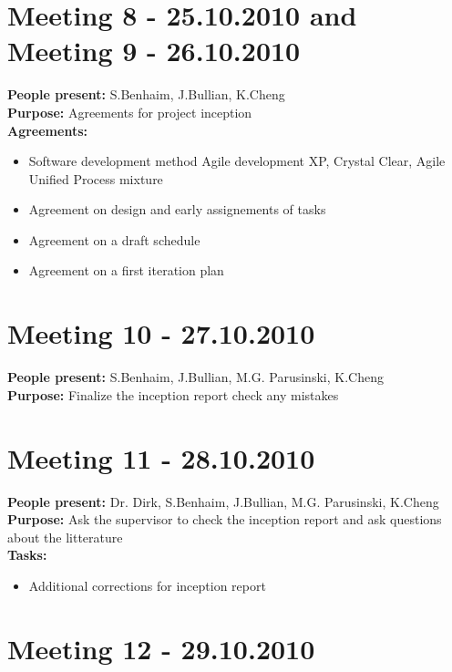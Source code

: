 \documentclass[12pt]{article}
\begin{document}
\section*{Meeting 8 - 25.10.2010 and Meeting 9 - 26.10.2010 }

\textbf{People present:} S.Benhaim, J.Bullian, K.Cheng \\
\textbf{Purpose:} Agreements for project inception \\
\textbf{Agreements:}
\begin{itemize}
\item Software development method Agile development XP, Crystal Clear, Agile Unified Process mixture
\item Agreement on design and early assignements of tasks
\item Agreement on a draft schedule
\item Agreement on a first iteration plan
\end{itemize}

\section*{Meeting 10 - 27.10.2010}

\textbf{People present:} S.Benhaim, J.Bullian, M.G. Parusinski, K.Cheng \\
\textbf{Purpose:} Finalize the inception report check any mistakes \\

\section*{Meeting 11 - 28.10.2010}

\textbf{People present:} Dr. Dirk, S.Benhaim, J.Bullian, M.G. Parusinski, K.Cheng \\
\textbf{Purpose:} Ask the supervisor to check the inception report and ask questions about the litterature \\
\textbf{Tasks:} \\ 
\begin{itemize}
\item Additional corrections for inception report
\end{itemize}

\section*{Meeting 12 - 29.10.2010}
\end{document}
